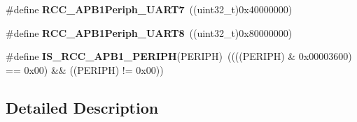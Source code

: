 \begin{DoxyCompactItemize}
\item 
\mbox{\label{group___r_c_c___a_p_b1___peripherals_ga6f9f5e54a34827e8c1e31f9a37173aaf}} 
\#define {\bfseries R\+C\+C\+\_\+\+A\+P\+B1\+Periph\+\_\+\+U\+A\+R\+T7}~((uint32\+\_\+t)0x40000000)
\item 
\mbox{\label{group___r_c_c___a_p_b1___peripherals_ga1501eb2bea1f362ff73b0f88fa23ec12}} 
\#define {\bfseries R\+C\+C\+\_\+\+A\+P\+B1\+Periph\+\_\+\+U\+A\+R\+T8}~((uint32\+\_\+t)0x80000000)
\item 
\mbox{\label{group___r_c_c___a_p_b1___peripherals_gab68e85308494436c4c55a69c42a79f36}} 
\#define {\bfseries I\+S\+\_\+\+R\+C\+C\+\_\+\+A\+P\+B1\+\_\+\+P\+E\+R\+I\+PH}(P\+E\+R\+I\+PH)~((((P\+E\+R\+I\+PH) \& 0x00003600) == 0x00) \&\& ((\+P\+E\+R\+I\+P\+H) != 0x00))
\end{DoxyCompactItemize}


\subsection{Detailed Description}
